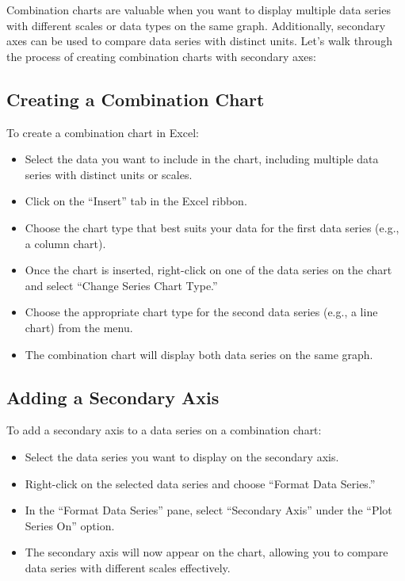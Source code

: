 \documentclass[
]{book}
\providecommand{\tightlist}{%
  \setlength{\itemsep}{0pt}\setlength{\parskip}{0pt}}
\begin{document}
Combination charts are valuable when you want to display multiple data series with different scales or data types on the same graph. Additionally, secondary axes can be used to compare data series with distinct units. Let's walk through the process of creating combination charts with secondary axes:

\hypertarget{creating-a-combination-chart}{%
\subsection{Creating a Combination Chart}\label{creating-a-combination-chart}}

To create a combination chart in Excel:

\begin{itemize}
\tightlist
\item
  Select the data you want to include in the chart, including multiple data series with distinct units or scales.
\item
  Click on the ``Insert'' tab in the Excel ribbon.
\item
  Choose the chart type that best suits your data for the first data series (e.g., a column chart).
\item
  Once the chart is inserted, right-click on one of the data series on the chart and select ``Change Series Chart Type.''
\item
  Choose the appropriate chart type for the second data series (e.g., a line chart) from the menu.
\item
  The combination chart will display both data series on the same graph.
\end{itemize}

\hypertarget{adding-a-secondary-axis}{%
\subsection{Adding a Secondary Axis}\label{adding-a-secondary-axis}}

To add a secondary axis to a data series on a combination chart:

\begin{itemize}
\tightlist
\item
  Select the data series you want to display on the secondary axis.
\item
  Right-click on the selected data series and choose ``Format Data Series.''
\item
  In the ``Format Data Series'' pane, select ``Secondary Axis'' under the ``Plot Series On'' option.
\item
  The secondary axis will now appear on the chart, allowing you to compare data series with different scales effectively.
\end{itemize}
\end{document}
